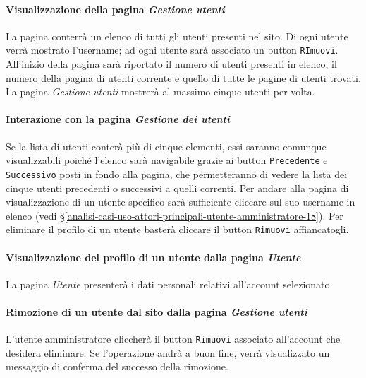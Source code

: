 \paragraph{Visualizzazione della pagina \textit{Gestione utenti}}
\label{analisi-casi-uso-attori-principali-utente-amministratore-14}
La pagina conterrà un elenco di tutti gli utenti presenti nel sito. Di ogni utente verrà mostrato l'username; ad ogni utente sarà associato un button \texttt{RImuovi}. All'inizio della pagina sarà riportato il numero di utenti presenti in elenco, il numero della pagina di utenti corrente e quello di tutte le pagine di utenti trovati. La pagina \textit{Gestione utenti} mostrerà al massimo cinque utenti per volta.


\paragraph{Interazione con la pagina \textit{Gestione dei utenti}}
\label{analisi-casi-uso-attori-principali-utente-amministratore-15}
Se la lista di utenti conterà più di cinque elementi, essi saranno comunque visualizzabili poiché l'elenco sarà navigabile grazie ai button \texttt{Precedente} e \texttt{Successivo} posti in fondo alla pagina, che permetteranno di vedere la lista dei cinque utenti precedenti o successivi a quelli correnti. Per andare alla pagina di visualizzazione di un utente specifico sarà sufficiente cliccare sul suo username in elenco (vedi §\ref{analisi-casi-uso-attori-principali-utente-amministratore-18}). Per eliminare il profilo di un utente basterà cliccare il button \texttt{Rimuovi} affiancatogli.


\paragraph{Visualizzazione del profilo di un utente dalla pagina \textit{Utente}}
\label{analisi-casi-uso-attori-principali-utente-amministratore-16}
La pagina \textit{Utente} presenterà i dati personali relativi all'account selezionato.


\paragraph{Rimozione di un utente dal sito dalla pagina \textit{Gestione utenti}}
\label{analisi-casi-uso-attori-principali-utente-amministratore-17}
L'utente amministratore cliccherà il button \texttt{Rimuovi} associato all'account che desidera eliminare. Se l'operazione andrà a buon fine, verrà visualizzato un messaggio di conferma del successo della rimozione.


